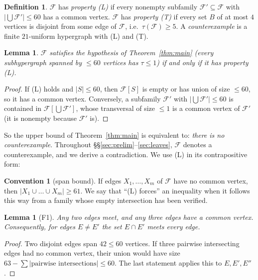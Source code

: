\documentclass[11pt]{amsart}
\newtheorem{lemma}[theorem]{Lemma}
\theoremstyle{definition}
\newtheorem{definition}[theorem]{Definition}
\newtheorem{convention}[theorem]{Convention}
\newcommand{\cF}{\mathcal{F}}
\begin{document}
\begin{definition}
$\cF$ has \emph{property (L)} if every nonempty subfamily $\cF'\subseteq\cF$ with $|\bigcup\cF'|\le 60$ has a common vertex. $\cF$ has \emph{property (T)} if every set $B$ of at most $4$ vertices is disjoint from some edge of $\cF$, i.e.\ $\tau(\cF)\ge 5$. A \emph{counterexample} is a finite $21$-uniform hypergraph with (L) and (T).
\end{definition}

\begin{lemma}\label{lem:local-L}
$\cF$ satisfies the hypothesis of Theorem~\ref{thm:main} (every subhypergraph spanned by $\le 60$ vertices has $\tau\le1$) if and only if it has property (L).
\end{lemma}
\begin{proof}
If (L) holds and $|S|\le 60$, then $\cF[S]$ is empty or has union of size $\le 60$, so it has a common vertex. Conversely, a subfamily $\cF'$ with $|\bigcup\cF'|\le 60$ is contained in $\cF[\bigcup\cF']$, whose transversal of size $\le 1$ is a common vertex of $\cF'$ (it is nonempty because $\cF'$ is).
\end{proof}

So the upper bound of Theorem~\ref{thm:main} is equivalent to: \emph{there is no counterexample}. Throughout \S\S\ref{sec:prelim}--\ref{sec:leaves}, $\cF$ denotes a counterexample, and we derive a contradiction. We use (L) in its contrapositive form:

\begin{convention}[span bound]
If edges $X_1,\dots,X_m$ of $\cF$ have no common vertex, then $|X_1\cup\dots\cup X_m|\ge 61$. We say that ``(L) forces'' an inequality when it follows this way from a family whose empty intersection has been verified.
\end{convention}

\begin{lemma}[F1]\label{lem:F1}
Any two edges meet, and any three edges have a common vertex. Consequently, for edges $E\ne E'$ the set $E\cap E'$ meets every edge.
\end{lemma}
\begin{proof}
Two disjoint edges span $42\le 60$ vertices. If three pairwise intersecting edges had no common vertex, their union would have size $63-\sum|\text{pairwise intersections}|\le 60$. The last statement applies this to $E,E',E''$.
\end{proof}
\end{document}
